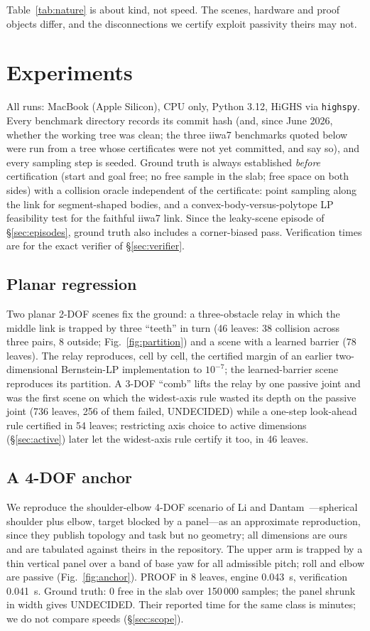 \documentclass[10pt,twocolumn,letterpaper]{article}
\begin{document}
Table~\ref{tab:nature} is about kind, not speed. The scenes, hardware and proof objects differ, and the disconnections we certify exploit passivity theirs may not.

\section{Experiments}\label{sec:experiments}

All runs: MacBook (Apple Silicon), CPU only, Python 3.12, HiGHS via \texttt{highspy}. Every benchmark directory records its commit hash (and, since June 2026, whether the working tree was clean; the three iiwa7 benchmarks quoted below were run from a tree whose certificates were not yet committed, and say so), and every sampling step is seeded. Ground truth is always established \emph{before} certification (start and goal free; no free sample in the slab; free space on both sides) with a collision oracle independent of the certificate: point sampling along the link for segment-shaped bodies, and a convex-body-versus-polytope LP feasibility test for the faithful iiwa7 link. Since the leaky-scene episode of \S\ref{sec:episodes}, ground truth also includes a corner-biased pass. Verification times are for the exact verifier of \S\ref{sec:verifier}.

\subsection{Planar regression}
Two planar 2-DOF scenes fix the ground: a three-obstacle relay in which the middle link is trapped by three ``teeth'' in turn (46 leaves: 38 collision across three pairs, 8 outside; Fig.~\ref{fig:partition}) and a scene with a learned barrier (78 leaves). The relay reproduces, cell by cell, the certified margin of an earlier two-dimensional Bernstein-LP implementation to $10^{-7}$; the learned-barrier scene reproduces its partition. A 3-DOF ``comb'' lifts the relay by one passive joint and was the first scene on which the widest-axis rule wasted its depth on the passive joint (736 leaves, 256 of them failed, UNDECIDED) while a one-step look-ahead rule certified in 54 leaves; restricting axis choice to active dimensions (\S\ref{sec:active}) later let the widest-axis rule certify it too, in 46 leaves.

\subsection{A 4-DOF anchor}\label{sec:anchor}
We reproduce the shoulder-elbow 4-DOF scenario of Li and Dantam~\cite{li2021rss}---spherical shoulder plus elbow, target blocked by a panel---as an approximate reproduction, since they publish topology and task but no geometry; all dimensions are ours and are tabulated against theirs in the repository. The upper arm is trapped by a thin vertical panel over a band of base yaw for all admissible pitch; roll and elbow are passive (Fig.~\ref{fig:anchor}). PROOF in 8 leaves, engine 0.043~s, verification 0.041~s. Ground truth: 0 free in the slab over 150\,000 samples; the panel shrunk in width gives UNDECIDED. Their reported time for the same class is minutes; we do not compare speeds (\S\ref{sec:scope}).
\end{document}
